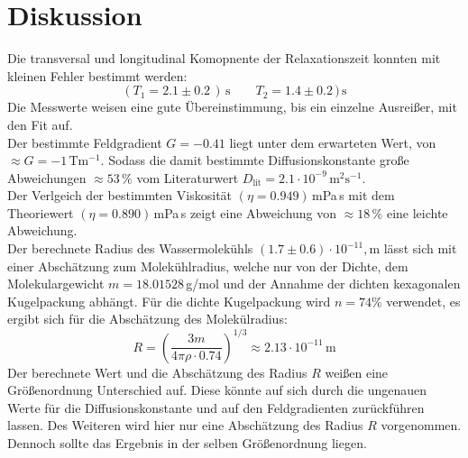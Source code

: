 \section{Diskussion}
\label{sec:Diskussion}
Die transversal und longitudinal Komopnente der Relaxationszeit konnten
mit kleinen Fehler bestimmt werden:
$$(T_1=2.1 \pm 0.2 \,)\, \text{s} \quad \quad T_2=1.4 \pm 0.2 \,)\, \text{s}$$
Die Messwerte weisen eine gute Übereinstimmung, bis ein
einzelne Ausreißer, mit den Fit auf.\\
Der bestimmte Feldgradient $G=-0.41$ liegt unter dem erwarteten Wert,
von $\approx G=-1\,\text{T}\text{m}^{-1}$. Sodass die damit bestimmte
Diffusionskonstante große Abweichungen $\approx 53\, \%$ vom Literaturwert $D_\text{lit}=2.1\cdot
10^{-9}\,\text{m}^2\text{s}^{-1}$\cite{diff}.\\
Der Verlgeich der bestimmten Viskosität $(\eta=0.949)\,$mPa$\,$s
mit dem Theoriewert $(\eta=0.890)\,$mPa$\,$s \cite{visko} zeigt eine Abweichung von $\approx
18\,\%$ eine leichte Abweichung.\\
Der berechnete Radius des Wassermolekühls $(1.7 \pm 0.6)\cdot 10^{-11},$m
lässt sich mit einer Abschätzung zum Molekühlradius,
welche nur von der Dichte, dem Molekulargewicht $m=18.01528\,$g/mol \cite{visko}
und der Annahme der dichten kexagonalen Kugelpackung abhängt. Für
die dichte Kugelpackung wird $n=74\%$ verwendet, es ergibt sich für
die Abschätzung des Molekülradius:
$$R=\left( \frac{3m}{4\pi \rho \cdot 0.74}\right)^{1/3}\approx 2.13\cdot 10^{-11}\,\text{m}$$
Der berechnete Wert und die Abschätzung des Radius $R$ weißen eine
Größenordnung Unterschied auf. Diese könnte auf sich durch die
ungenauen Werte für die Diffusionskonstante und auf den Feldgradienten
zurückführen lassen. Des Weiteren wird hier nur eine Abschätzung des Radius
$R$ vorgenommen. Dennoch sollte das Ergebnis in der selben
Größenordnung liegen.
